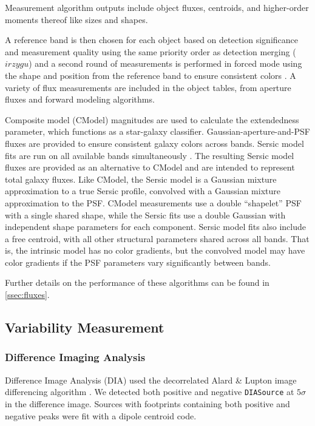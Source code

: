 Measurement algorithm outputs include object fluxes, centroids, and higher-order moments thereof like sizes and shapes. 

A reference band is then chosen for each object based on detection significance and measurement quality using the same priority order as detection merging ($irzygu$) and a second round of measurements is performed in forced mode using the shape and position from the reference band to ensure consistent colors \citep{2018PASJ...70S...5B}.
A variety of flux measurements are included in the object tables, from aperture fluxes and forward modeling algorithms. 

Composite model (CModel) magnitudes are used to calculate the extendedness parameter, which functions as a star-galaxy classifier. 
Gaussian-aperture-and-PSF \citep[GAaP][]{2008A&A...482.1053K, DMTN-190} fluxes are provided to ensure consistent galaxy colors across bands.
Sersic model fits are run on all available bands simultaneously \cite[MultiProFit][]{dmtn-312}.
The resulting Sersic \citep{1963BAAA....6...41S, 1968adga.book.....S} model fluxes are provided as an alternative to CModel and are intended to represent total galaxy fluxes.
Like CModel, the Sersic model is a Gaussian mixture approximation to a true Sersic profile, convolved with a Gaussian mixture approximation to the PSF.
CModel measurements use a double ``shapelet'' \citep{2003ARA&A..41..645R} PSF with a single shared shape, while the Sersic fits use a double Gaussian with independent shape parameters for each component.
Sersic model fits also include a free centroid, with all other structural parameters shared across all bands.
That is, the intrinsic model has no color gradients, but the convolved model may have color gradients if the PSF parameters vary significantly between bands.

Further details on the performance of these algorithms can be found in \ref{ssec:fluxes}.

\subsection{Variability Measurement}

\subsubsection{Difference Imaging Analysis
\label{ssec:difim_analysis}}
Difference Image Analysis (DIA) used the decorrelated Alard \& Lupton image differencing algorithm \citep{DMTN-021}.  
We detected both positive and negative \texttt{DIASource} at $5\sigma$ in the difference image.  
Sources with footprints containing both positive and negative peaks were fit with a dipole centroid code.  

